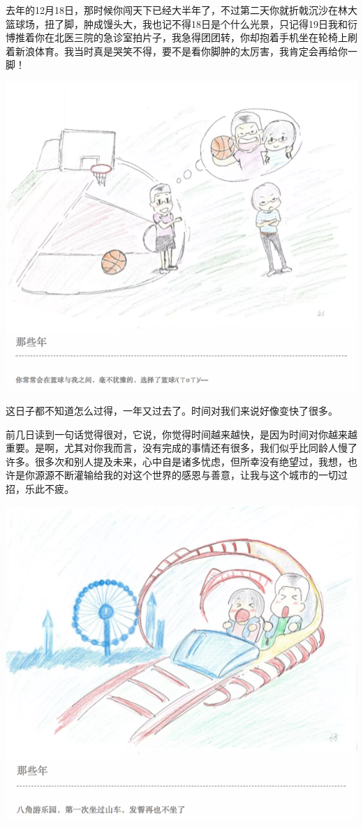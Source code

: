 \documentclass[
]{book}
\begin{document}
去年的12月18日，那时候你闯天下已经大半年了，不过第二天你就折戟沉沙在林大篮球场，扭了脚，肿成馒头大，我也记不得18日是个什么光景，只记得19日我和衍博推着你在北医三院的急诊室拍片子，我急得团团转，你却抱着手机坐在轮椅上刷着新浪体育。我当时真是哭笑不得，要不是看你脚肿的太厉害，我肯定会再给你一脚！

\includegraphics[width=8.33in]{images/wife3}

这日子都不知道怎么过得，一年又过去了。时间对我们来说好像变快了很多。

前几日读到一句话觉得很对，它说，你觉得时间越来越快，是因为时间对你越来越重要。是啊，尤其对你我而言，没有完成的事情还有很多，我们似乎比同龄人慢了许多。很多次和别人提及未来，心中自是诸多忧虑，但所幸没有绝望过，我想，也许是你源源不断灌输给我的对这个世界的感恩与善意，让我与这个城市的一切过招，乐此不疲。

\includegraphics[width=8.33in]{images/wife4}
\end{document}
